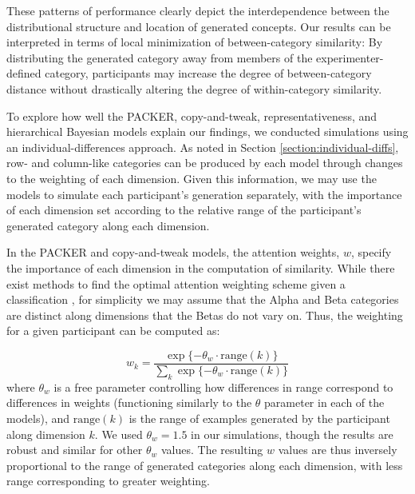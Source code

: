 \documentclass[12pt]{article}
\begin{document}
\begin{flushleft}
These patterns of performance clearly depict the interdependence between the
distributional structure and location of generated concepts. Our results can be
interpreted in terms of local minimization of between-category similarity: By
distributing the generated category away from members of the
experimenter-defined category, participants may increase the degree of
between-category distance without drastically altering the degree of
within-category similarity.

To explore how well the PACKER, copy-and-tweak, representativeness, and
hierarchical Bayesian models explain our findings, we conducted simulations
using an individual-differences approach. As noted in Section
\ref{section:individual-diffs}, row- and column-like categories can be produced
by each model through changes to the weighting of each dimension. Given this
information, we may use the models to simulate each participant's generation
separately, with the importance of each dimension set according to the relative
range of the participant's generated category along each dimension.

In the PACKER and copy-and-tweak models, the attention weights, $w$, specify the
importance of each dimension in the computation of similarity. While there exist
methods to find the optimal attention weighting scheme given a classification
\citep[see][]{vanpaemel2012using}, for simplicity we may assume that the Alpha
and Beta categories are distinct along dimensions that the Betas do not vary on.
Thus, the weighting for a given participant can be computed as:

\begin{equation} w_k = \dfrac {\exp{ \{ -\theta_w \cdot\text{range}(k)} \} } {
\sum_k {\exp{ \{ -\theta_w \cdot\text{range}(k)} \} } }
\label{eq:range-weight}
\end{equation}
% 
where $\theta_w$ is a free parameter controlling how differences in range
correspond to differences in weights (functioning similarly to the $\theta$
parameter in each of the models), and $\text{range}(k)$ is the range of examples
generated by the participant along dimension $k$. We used $\theta_w = 1.5$ in
our simulations, though the results are robust and similar for other $\theta_w$
values. The resulting $w$ values are thus inversely proportional to the range of
generated categories along each dimension, with less range corresponding to
greater weighting.


\end{flushleft}
\end{document}
